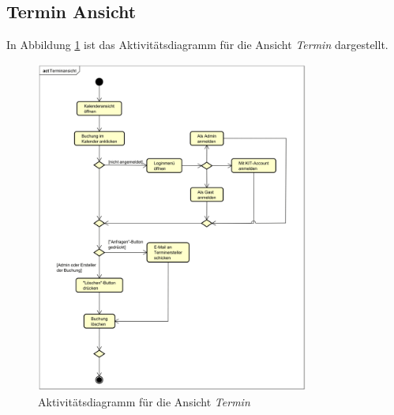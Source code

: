 \clearpage
\subsection{Termin Ansicht}
In Abbildung \ref{fig:activity_diagram_calendar} ist das Aktivitätsdiagramm für die Ansicht \textit{Termin} dargestellt.
\begin{figure}[ht]
    \centering
    \includegraphics[width=0.8\textwidth]{figures/activitydiagrams/terminansicht}
    \caption{Aktivitätsdiagramm für die Ansicht \textit{Termin}}
    \label{fig:activity_diagram_calendar}
\end{figure}